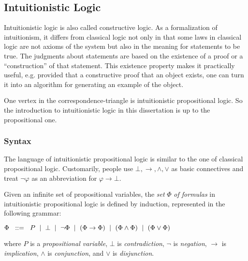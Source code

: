 \subsection{Intuitionistic Logic}
\label{sec:bg_il}
Intuitionistic logic is also called constructive logic. As a formalization of intuitionism, it differs from classical logic not only in that some laws in classical logic are not axioms of the system but also in the meaning for statements to be true. The judgments about statements are based on the existence of a proof or a ``construction'' of that statement. This existence property makes it practically useful, e.g. provided that a constructive proof that an object exists, one can turn it into an algorithm for generating an example of the object.

One vertex in the correspondence-triangle is intuitionistic propositional logic. So the introduction to intuitionistic logic in this dissertation is up to the propositional one.

\subsubsection{Syntax}
\label{sec:bg_il_s}
The language of intuitionistic propositional logic is similar to the one of classical propositional logic. Customarily, people use $ \bot , \to , \land , \lor $ as basic connectives and treat $ \neg \varphi $ as an abbreviation for $ \varphi \to \bot $.

\begin{definition}
\label{definition:formulas}
Given an infinite set of propositional variables, the \emph{set} $ \Phi $ \emph{of formulas} in intuitionistic propositional logic is defined by induction, represented in the following grammar:
\begin{center}
$ \Phi \hspace*{6pt} ::= \hspace*{6pt} P \hspace*{6pt} | \hspace*{6pt} \bot \hspace*{6pt} | \hspace*{6pt} \neg \Phi \hspace*{6pt} | \hspace*{6pt} ( \Phi \to \Phi ) \hspace*{6pt} | \hspace*{6pt} ( \Phi \land \Phi ) \hspace*{6pt} | \hspace*{6pt} ( \Phi \lor \Phi ) $
\end{center}
where $ P $ is a \emph{propositional variable}, $ \bot $ is \emph{contradiction}, $ \neg $ is \emph{negation}, $ \to $ is \emph{implication}, $ \land $ is \emph{conjunction}, and $ \lor $ is \emph{disjunction}.
\end{definition}

